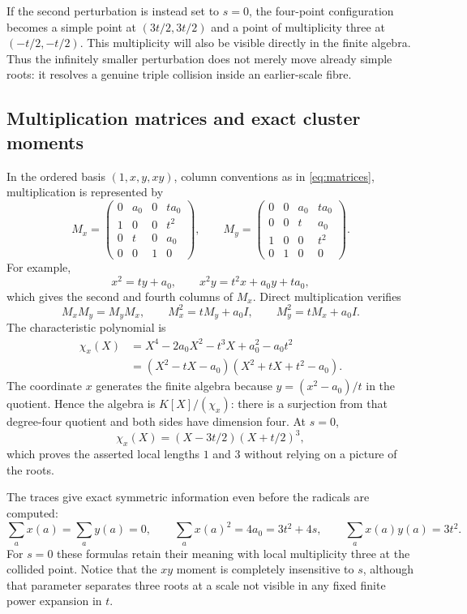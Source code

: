 \documentclass[11pt,letterpaper]{article}
\theoremstyle{definition}
\theoremstyle{remark}
\numberwithin{equation}{section}
\begin{document}
If the second perturbation is instead set to $s=0$, the four-point configuration becomes a simple point at $(3t/2,3t/2)$ and a point of multiplicity three at $(-t/2,-t/2)$. This multiplicity will also be visible directly in the finite algebra. Thus the infinitely smaller perturbation does not merely move already simple roots: it resolves a genuine triple collision inside an earlier-scale fibre.

\subsection{Multiplication matrices and exact cluster moments}
In the ordered basis $(1,x,y,xy)$, column conventions as in \eqref{eq:matrices}, multiplication is represented by
\begin{equation}\label{eq:Mexample}
 M_x=\begin{pmatrix}
 0&a_0&0&ta_0\\
 1&0&0&t^2\\
 0&t&0&a_0\\
 0&0&1&0
 \end{pmatrix},\qquad
 M_y=\begin{pmatrix}
 0&0&a_0&ta_0\\
 0&0&t&a_0\\
 1&0&0&t^2\\
 0&1&0&0
 \end{pmatrix}.
\end{equation}
For example,
\[
 x^2=ty+a_0,\qquad x^2y=t^2x+a_0y+ta_0,
\]
which gives the second and fourth columns of $M_x$. Direct multiplication verifies
\[
 M_xM_y=M_yM_x,\qquad
 M_x^2=tM_y+a_0I,\qquad M_y^2=tM_x+a_0I.
\]
The characteristic polynomial is
\begin{align}
 \chi_x(X)
 &=X^4-2a_0X^2-t^3X+a_0^2-a_0t^2\label{eq:charpoly}\\
 &=(X^2-tX-a_0)(X^2+tX+t^2-a_0).\nonumber
\end{align}
The coordinate $x$ generates the finite algebra because $y=(x^2-a_0)/t$ in the quotient. Hence the algebra is $K[X]/(\chi_x)$: there is a surjection from that degree-four quotient and both sides have dimension four. At $s=0$,
\[
 \chi_x(X)=(X-3t/2)(X+t/2)^3,
\]
which proves the asserted local lengths $1$ and $3$ without relying on a picture of the roots.

The traces give exact symmetric information even before the radicals are computed:
\begin{equation}\label{eq:exampletraces}
 \sum_a x(a)=\sum_a y(a)=0,\qquad
 \sum_a x(a)^2=4a_0=3t^2+4s,\qquad
 \sum_a x(a)y(a)=3t^2.
\end{equation}
For $s=0$ these formulas retain their meaning with local multiplicity three at the collided point. Notice that the $xy$ moment is completely insensitive to $s$, although that parameter separates three roots at a scale not visible in any fixed finite power expansion in $t$.
\end{document}
